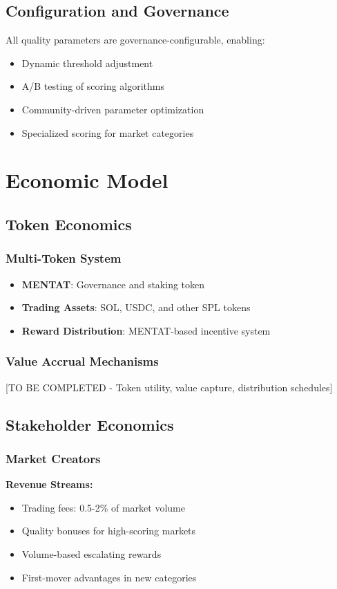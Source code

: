 \documentclass[11pt,a4paper]{article}
\begin{document}
\subsection{Configuration and Governance}
All quality parameters are governance-configurable, enabling:
\begin{itemize}
    \item Dynamic threshold adjustment
    \item A/B testing of scoring algorithms
    \item Community-driven parameter optimization
    \item Specialized scoring for market categories
\end{itemize}

\section{Economic Model}

\subsection{Token Economics}

\subsubsection{Multi-Token System}
\begin{itemize}
    \item \textbf{MENTAT}: Governance and staking token
    \item \textbf{Trading Assets}: SOL, USDC, and other SPL tokens
    \item \textbf{Reward Distribution}: MENTAT-based incentive system
\end{itemize}

\subsubsection{Value Accrual Mechanisms}
[TO BE COMPLETED - Token utility, value capture, distribution schedules]

\subsection{Stakeholder Economics}

\subsubsection{Market Creators}
\textbf{Revenue Streams:}
\begin{itemize}
    \item Trading fees: 0.5-2\% of market volume
    \item Quality bonuses for high-scoring markets
    \item Volume-based escalating rewards
    \item First-mover advantages in new categories
\end{itemize}
\end{document}
